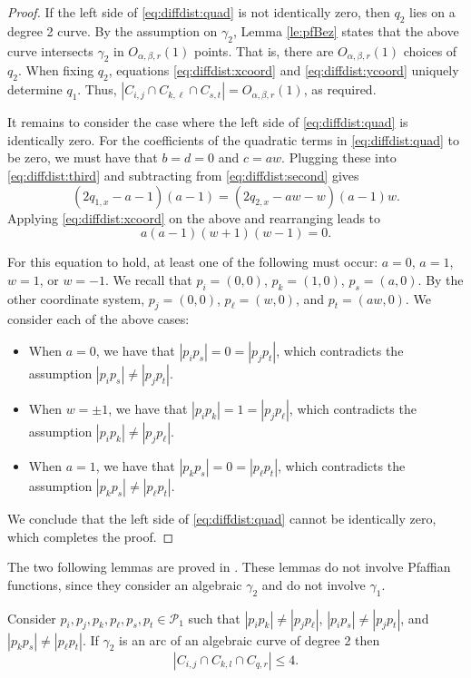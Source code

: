 \documentclass[11pt]{article}
\theoremstyle{definition}
\newcommand{\pts}{\mathcal{P}}
\begin{document}
\begin{proof}
If the left side of \eqref{eq:diffdist:quad} is not identically zero, then $q_2$ lies on a degree 2 curve.
By the assumption on $\gamma_2$, Lemma \ref{le:pfBez} states that the above curve intersects $\gamma_2$ in $O_{\alpha,\beta,r}(1)$ points.
That is, there are $O_{\alpha,\beta,r}(1)$ choices of $q_2$. 
When fixing $q_2$, equations \eqref{eq:diffdist:xcoord} and \eqref{eq:diffdist:ycoord} uniquely determine $q_1$.
Thus, $|C_{i,j}\cap C_{k,\ell} \cap C_{s,t}| =O_{\alpha,\beta,r}(1)$, as required.

It remains to consider the case where the left side of \eqref{eq:diffdist:quad} is identically zero.  
For the coefficients of the quadratic terms in \eqref{eq:diffdist:quad} to be zero, we must have that $b=d=0$ and $c=aw$.
Plugging these into \eqref{eq:diffdist:third} and subtracting from \eqref{eq:diffdist:second} gives
%
 \[  (2q_{1,x} - a - 1)(a - 1) = (2q_{2,x} - aw - w)(a - 1)w. \]
%
Applying \eqref{eq:diffdist:xcoord} on the above and rearranging leads to 
 \begin{equation*} 
      a(a - 1)(w + 1)(w - 1) = 0.
 \end{equation*}
 
For this equation to hold, at least one of the following must occur: $a=0$, $a=1$, $w=1$, or $w=-1$.
We recall that $p_i=(0,0)$, $p_k=(1,0)$, $p_s=(a,0)$. 
By the other coordinate system, $p_j=(0,0)$, $p_\ell=(w,0)$, and $p_t=(aw,0)$.
We consider each of the above cases:
\begin{itemize}[itemsep=1pt,topsep=1pt]
\item When $a=0$, we have that $|p_ip_s|=0=|p_jp_t|$, which contradicts the assumption $|p_ip_s|\neq |p_jp_t|$.
\item When $w=\pm 1$, we have that $|p_ip_k|=1=|p_jp_\ell|$, which contradicts the assumption $|p_ip_k|\neq|p_jp_\ell|$.
\item When $a=1$, we have that $|p_kp_s|=0=|p_\ell p_t|$, which contradicts the assumption $|p_kp_s|\neq|p_\ell p_t|$.
\end{itemize}
% 
We conclude that the left side of \eqref{eq:diffdist:quad} cannot be identically zero, which completes the proof.
%
\end{proof}

The two following lemmas are proved in \cite{PachDZ17}. 
These lemmas do not involve Pfaffian functions, since they consider an algebraic $\gamma_2$ and do not involve $\gamma_1$.

\begin{lemma}\label{le:conic}
Consider $p_i,p_j,p_k,p_\ell,p_s,p_t\in \pts_1$ such that 
 $|p_i p_k| \neq |p_j p_\ell|$, 
 $|p_i p_s| \neq |p_j p_t|$, and 
 $|p_k p_s| \neq |p_\ell p_t|$.
If $\gamma_2$ is an arc of an algebraic curve of degree 2 then
%
\[ |C_{i,j}\cap C_{k,l} \cap C_{q,r}| \le 4. \]
\end{lemma} 
   
\end{document}
